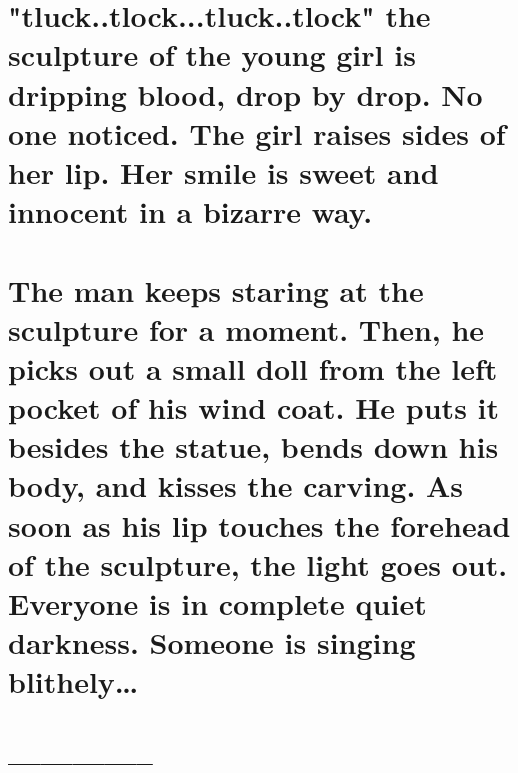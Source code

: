 \documentclass{article}
\begin{document}
\section{"tluck..tlock...tluck..tlock" the sculpture of the young girl is dripping blood, drop by drop. No one noticed. The girl raises sides of her lip. Her smile is sweet and innocent in a bizarre way. } 
\section{The man keeps staring at the sculpture for a moment. Then, he picks out a small doll from the left pocket of his wind coat. He puts it besides the statue, bends down his body, and kisses the carving. As soon as his lip touches the forehead of the sculpture, the light goes out. Everyone is in complete quiet darkness. Someone is singing blithely…}
\section{--------------}
\end{document}
